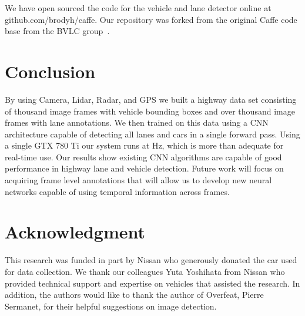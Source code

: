 \documentclass[journal]{IEEEtran}
\begin{document}
We have open sourced the code for the vehicle and lane detector online at github.com/brodyh/caffe. Our repository was forked from the original Caffe code base from the BVLC group~\cite{jia-2014}.

\section{Conclusion}
By using Camera, Lidar, Radar, and GPS we built a highway data set consisting of  thousand image frames with vehicle bounding boxes and over  thousand image frames with lane annotations. We then trained on this data using a CNN architecture capable of detecting all lanes and cars in a single forward pass. Using a single GTX 780 Ti our system runs at Hz, which is more than adequate for real-time use. Our results show existing CNN algorithms are capable of good performance in highway lane and vehicle detection. Future work will focus on acquiring frame level annotations that will allow us to develop new neural networks capable of using temporal information across frames.































\section*{Acknowledgment}

This research was funded in part by Nissan who generously donated the car used for data collection. We thank our colleagues Yuta Yoshihata from Nissan who provided technical support and expertise on vehicles that assisted the research. In addition, the authors would like to thank the author of Overfeat, Pierre Sermanet, for their helpful suggestions on image detection. 
\end{document}
